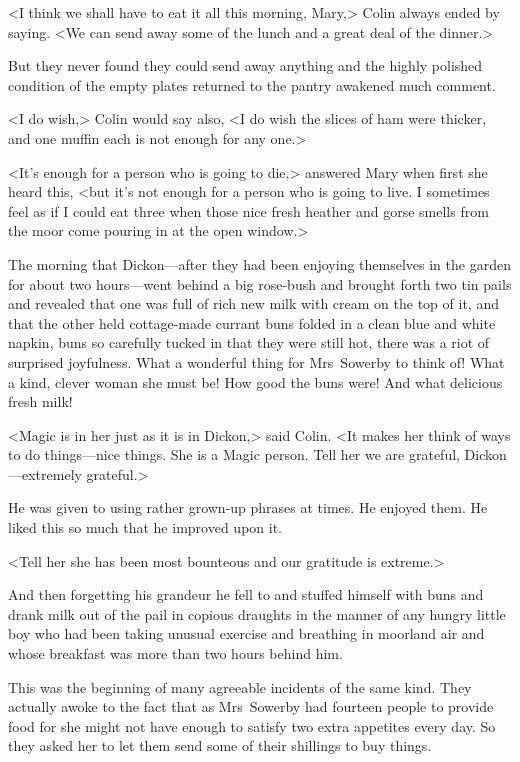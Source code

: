 <I think we shall have to eat it all this morning, Mary,> Colin always ended by saying. <We can send away some of the lunch and a great deal of the dinner.>

But they never found they could send away anything and the highly polished condition of the empty plates returned to the pantry awakened much comment.

<I do wish,> Colin would say also, <I do wish the slices of ham were thicker, and one muffin each is not enough for any one.>

<It's enough for a person who is going to die,> answered Mary when first she heard this, <but it's not enough for a person who is going to live. I sometimes feel as if I could eat three when those nice fresh heather and gorse smells from the moor come pouring in at the open window.>

The morning that Dickon—after they had been enjoying themselves in the garden for about two hours—went behind a big rose-bush and brought forth two tin pails and revealed that one was full of rich new milk with cream on the top of it, and that the other held cottage-made currant buns folded in a clean blue and white napkin, buns so carefully tucked in that they were still hot, there was a riot of surprised joyfulness. What a wonderful thing for Mrs~Sowerby to think of! What a kind, clever woman she must be! How good the buns were! And what delicious fresh milk!

<Magic is in her just as it is in Dickon,> said Colin. <It makes her think of ways to do things—nice things. She is a Magic person. Tell her we are grateful, Dickon—extremely grateful.>

He was given to using rather grown-up phrases at times. He enjoyed them. He liked this so much that he improved upon it.

<Tell her she has been most bounteous and our gratitude is extreme.>

And then forgetting his grandeur he fell to and stuffed himself with buns and drank milk out of the pail in copious draughts in the manner of any hungry little boy who had been taking unusual exercise and breathing in moorland air and whose breakfast was more than two hours behind him.

This was the beginning of many agreeable incidents of the same kind. They actually awoke to the fact that as Mrs~Sowerby had fourteen people to provide food for she might not have enough to satisfy two extra appetites every day. So they asked her to let them send some of their shillings to buy things.

